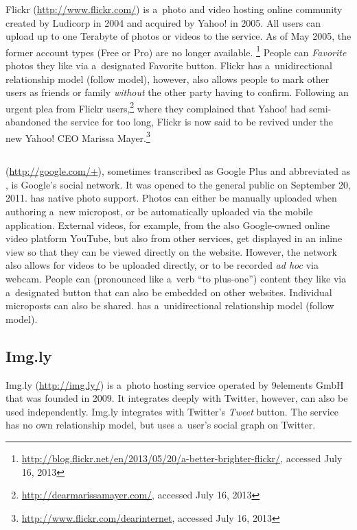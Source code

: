 Flickr (\url{http://www.flickr.com/})
is a~photo and video hosting online community
created by Ludicorp in 2004 and acquired by Yahoo! in 2005.
All users can upload up to one Terabyte of photos or videos
to the service.
As of May 2005, the former account types (Free or Pro)
are no longer available.%
\footnote{\url{http://blog.flickr.net/en/2013/05/20/a-better-brighter-flickr/},
accessed July 16, 2013}
People can \emph{Favorite} photos they like
via a~designated Favorite button.
Flickr has a~unidirectional relationship model (follow model),
however, also allows people to mark other users as friends
or family \emph{without} the other party having to confirm.
Following an urgent plea from Flickr
users,\footnote{\url{http://dearmarissamayer.com/},
accessed July 16, 2013}
where they complained that Yahoo!
had semi-abandoned the service for too long,
Flickr is now said to be revived under the new Yahoo! CEO Marissa
Mayer.\footnote{\url{http://www.flickr.com/dearinternet},
accessed July 16, 2013}

\subsection{\googleplus}

\googleplus (\url{http://google.com/+}),
sometimes transcribed as Google Plus
and abbreviated as \gplus, is Google's social network.
It was opened to the general public on September 20, 2011.
\googleplus has native photo support.
Photos can either be manually uploaded
when authoring a~new micropost,
or be automatically uploaded via the \googleplus
mobile application.
External videos, for example, from
the also Google-owned online video platform YouTube,
but also from other services,
get displayed in an inline view
so that they can be viewed directly on the website.
However, the network also allows for
videos to be uploaded directly,
or to be recorded \emph{ad hoc} via webcam.
People can \emph{\plusone}
(pronounced like a~verb ``to plus-one'') content they like
via a~designated \plusone button
that can also be embedded on other websites.
Individual microposts can also be shared.
\googleplus has a~unidirectional relationship model
(follow model).

\subsection{Img.ly}

Img.ly (\url{http://img.ly/})
is a~photo hosting service operated by 9elements GmbH
that was founded in 2009.
It integrates deeply with Twitter, however,
can also be used independently.
Img.ly integrates with Twitter's \emph{Tweet} button. 
The service has no own relationship model,
but uses a~user's social graph on Twitter.

